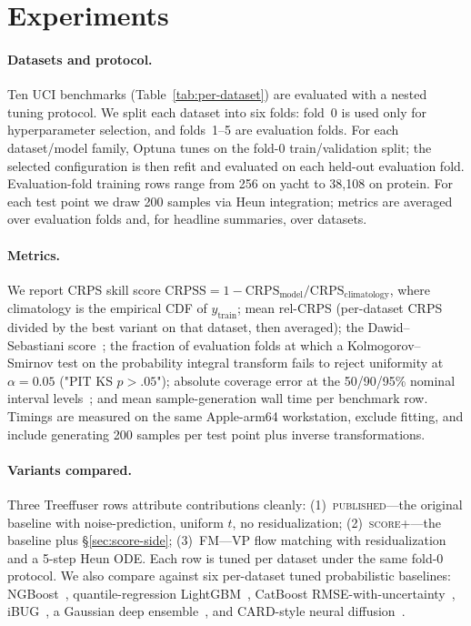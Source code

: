\documentclass{uai2026}
\newcommand{\crps}{\mathrm{CRPS}}
\newcommand{\crpss}{\mathrm{CRPSS}}
\begin{document}
\section{Experiments}\label{sec:exp}

\paragraph{Datasets and protocol.} Ten UCI benchmarks (Table~\ref{tab:per-dataset}) are evaluated with a nested tuning protocol. We split each dataset into six folds: fold~0 is used only for hyperparameter selection, and folds~1--5 are evaluation folds. For each dataset/model family, Optuna tunes on the fold-0 train/validation split; the selected configuration is then refit and evaluated on each held-out evaluation fold. Evaluation-fold training rows range from 256 on yacht to 38{,}108 on protein. For each test point we draw 200 samples via Heun integration; metrics are averaged over evaluation folds and, for headline summaries, over datasets.

\paragraph{Metrics.} We report CRPS skill score $\crpss = 1 - \crps_{\text{model}} / \crps_{\text{climatology}}$, where climatology is the empirical CDF of $y_{\text{train}}$; mean rel-CRPS (per-dataset CRPS divided by the best variant on that dataset, then averaged); the Dawid--Sebastiani score~\citep{dawid1984pit}; the fraction of evaluation folds at which a Kolmogorov--Smirnov test on the probability integral transform fails to reject uniformity at $\alpha=0.05$ ("PIT KS $p{>}.05$"); absolute coverage error at the 50/90/95\% nominal interval levels~\citep{gneiting2007crps}; and mean sample-generation wall time per benchmark row. Timings are measured on the same Apple-arm64 workstation, exclude fitting, and include generating 200 samples per test point plus inverse transformations.

\paragraph{Variants compared.} Three Treeffuser rows attribute contributions cleanly: (1)~\textsc{published}---the original baseline with noise-prediction, uniform $t$, no residualization; (2)~\textsc{score+}---the baseline plus \S\ref{sec:score-side}; (3)~\textsc{FM}---VP flow matching with residualization and a 5-step Heun ODE. Each row is tuned per dataset under the same fold-0 protocol. We also compare against six per-dataset tuned probabilistic baselines: NGBoost~\citep{duan2020ngboost}, quantile-regression LightGBM~\citep{ke2017lightgbm}, CatBoost RMSE-with-uncertainty~\citep{prokhorenkova2018catboost}, iBUG~\citep{brophy2022ibug}, a Gaussian deep ensemble~\citep{lakshminarayanan2017deep}, and CARD-style neural diffusion~\citep{han2022card}.
\end{document}
